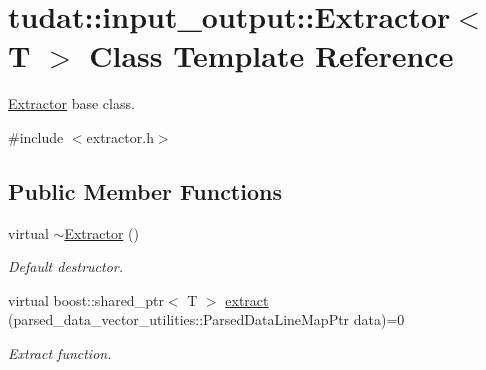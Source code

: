 \hypertarget{classtudat_1_1input__output_1_1Extractor}{}\section{tudat\+:\+:input\+\_\+output\+:\+:Extractor$<$ T $>$ Class Template Reference}
\label{classtudat_1_1input__output_1_1Extractor}


\hyperlink{classtudat_1_1input__output_1_1Extractor}{Extractor} base class.  




{\ttfamily \#include $<$extractor.\+h$>$}

\subsection*{Public Member Functions}
\begin{DoxyCompactItemize}
\item 
virtual \hyperlink{classtudat_1_1input__output_1_1Extractor_aff3c90a85713175523fcb917e7a2de8f}{$\sim$\+Extractor} ()\hypertarget{classtudat_1_1input__output_1_1Extractor_aff3c90a85713175523fcb917e7a2de8f}{}\label{classtudat_1_1input__output_1_1Extractor_aff3c90a85713175523fcb917e7a2de8f}

\begin{DoxyCompactList}\small\item\em Default destructor. \end{DoxyCompactList}\item 
virtual boost\+::shared\+\_\+ptr$<$ T $>$ \hyperlink{classtudat_1_1input__output_1_1Extractor_a702e1c0f4ffc78cad05c1005e3755e94}{extract} (parsed\+\_\+data\+\_\+vector\+\_\+utilities\+::\+Parsed\+Data\+Line\+Map\+Ptr data)=0
\begin{DoxyCompactList}\small\item\em Extract function. \end{DoxyCompactList}\end{DoxyCompactItemize}
